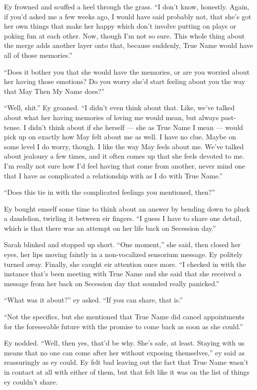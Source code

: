 Ey frowned and scuffed a heel through the grass. ``I don't know, honestly. Again, if you'd asked me a few weeks ago, I would have said probably not, that she's got her own things that make her happy which don't involve putting on plays or poking fun at each other. Now, though I'm not so sure. This whole thing about the merge adds another layer onto that, because suddenly, True Name would have all of those memories.''

``Does it bother you that she would have the memories, or are you worried about her having those emotions? Do you worry she'd start feeling about you the way that May Then My Name does?''

``Well, shit.'' Ey groaned. ``I didn't even think about that. Like, we've talked about what her having memories of loving me would mean, but always past-tense. I didn't think about if she herself — she as True Name I mean — would pick up on exactly how May felt about me as well. I have no clue. Maybe on some level I do worry, though. I like the way May feels about me. We've talked about jealousy a few times, and it often comes up that she feels devoted to me. I'm really not sure how I'd feel having that come from another, never mind one that I have as complicated a relationship with as I do with True Name.''

``Does this tie in with the complicated feelings you mentioned, then?''

Ey bought emself some time to think about an answer by bending down to pluck a dandelion, twirling it between eir fingers. ``I guess I have to share one detail, which is that there was an attempt on her life back on Secession day.''

Sarah blinked and stopped up short. ``One moment,'' she said, then closed her eyes, her lips moving faintly in a non-vocalized sensorium message. Ey politely turned away. Finally, she caught eir attention once more. ``I checked in with the instance that's been meeting with True Name and she said that she received a message from her back on Secession day that sounded really panicked.''

``What was it about?'' ey asked. ``If you can share, that is.''

``Not the specifics, but she mentioned that True Name did cancel appointments for the foreseeable future with the promise to come back as soon as she could.''

Ey nodded. ``Well, then yes, that'd be why. She's safe, at least. Staying with us means that no one can come after her without exposing themselves,'' ey said as reassuringly as ey could. Ey felt bad leaving out the fact that True Name wasn't in contact at all with either of them, but that felt like it was on the list of things ey couldn't share.

